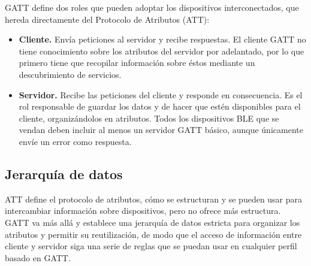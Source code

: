 GATT define dos roles que pueden adoptar los dispositivos interconectados, que hereda directamente del Protocolo de Atributos (ATT):
\begin{itemize}
	\item \textbf{Cliente.} Envía peticiones al servidor y recibe respuestas. El cliente GATT no tiene conocimiento sobre los atributos del servidor por adelantado, por lo que primero tiene que recopilar información sobre éstos mediante un descubrimiento de servicios.

	\item \textbf{Servidor.} Recibe las peticiones del cliente y responde en consecuencia. Es el rol responsable de guardar los datos y de hacer que estén disponibles para el cliente, organizándolos en atributos. Todos los dispositivos BLE que se vendan deben incluir al menos un servidor GATT básico, aunque únicamente envíe un error como respuesta.
\end{itemize}

\subsection{Jerarquía de datos}
\label{makereference2.4.1}

ATT define el protocolo de atributos, cómo se estructuran y se pueden usar para intercambiar información sobre dispositivos, pero no ofrece más estructura. GATT va más allá y establece una jerarquía de datos estricta para organizar los atributos y permitir su reutilización, de modo que el acceso de información entre cliente y servidor siga una serie de reglas que se puedan usar en cualquier perfil basado en GATT.

